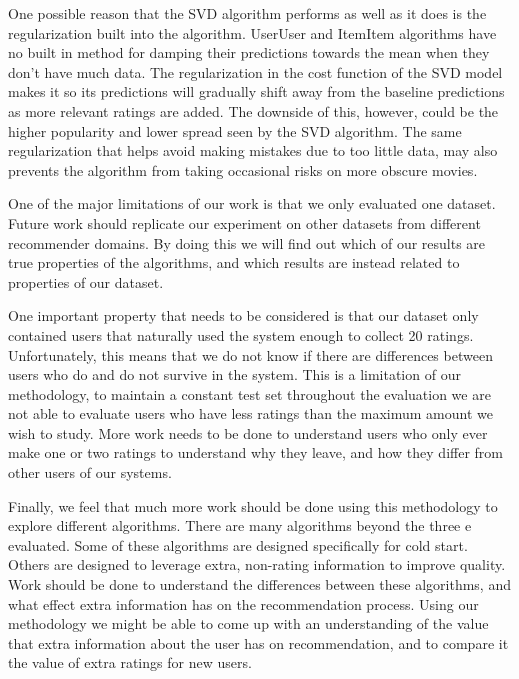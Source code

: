 \documentclass[letterpaper]{sig-alternate}
\begin{document}
  One possible reason that the SVD algorithm performs as well as it does is the regularization built into the algorithm.
  UserUser and ItemItem algorithms have no built in method for damping their predictions towards the mean when they don't have much data.
  The regularization in the cost function of the SVD model makes it so its predictions will gradually shift away from the baseline predictions as more relevant ratings are added.
  The downside of this, however, could be the higher popularity and lower spread seen by the SVD algorithm.
  The same regularization that helps avoid making mistakes due to too little data, may also prevents the algorithm from taking occasional risks on more obscure movies.
  


  One of the major limitations of our work is that we only evaluated one dataset.
  Future work should replicate our experiment on other datasets from different recommender domains.
  By doing this we will find out which of our results are true properties of the algorithms, and which results are instead related to properties of our dataset.

  One important property that needs to be considered is that our dataset only contained users that naturally used the system enough to collect 20 ratings.
  Unfortunately, this means that we do not know if there are differences between users who do and do not survive in the system.
  This is a limitation of our methodology, to maintain a constant test set throughout the evaluation we are not able to evaluate users who have less ratings than the maximum amount we wish to study.
  More work needs to be done to understand users who only ever make one or two ratings to understand why they leave, and how they differ from other users of our systems.

  Finally, we feel that much more work should be done using this methodology to explore different algorithms.
  There are many algorithms beyond the three e evaluated.
  Some of these algorithms are designed specifically for cold start.
  Others are designed to leverage extra, non-rating information to improve quality.
  Work should be done to understand the differences between these algorithms, and what effect extra information has on the recommendation process.
  Using our methodology we might be able to come up with an understanding of the value that extra information about the user has on recommendation, and to compare it the value of extra ratings for new users.
\end{document}
